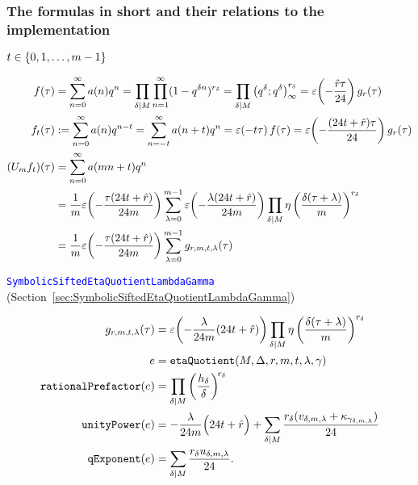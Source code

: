 \documentclass{article}
\begin{document}
\subsubsection{The formulas in short and their relations to the
  implementation}
\label{sec:formulas-in-short}
$t \in \left\{0,1,\ldots,m-1\right\}$

\begin{align*}
  f(\tau)
  &=
  \sum_{n=0}^\infty a(n) q^n
  =
  \prod_{\delta \mid M}\prod_{n=1}^\infty(1-q^{\delta n})^{r_\delta}
  =
  \prod_{\delta \mid M}\left( q^{\delta};q^{\delta} \right)_{\infty}^{r_\delta}
  =
  \varepsilon\!\left(-\frac{\hat{r} \tau}{24}\right) g_r(\tau)
  \\
  f_t(\tau)
  &:=
  \sum_{n=0}^\infty a(n) q^{n-t}
  =
  \sum_{n=-t}^\infty a(n+t) q^{n}
  =
  \varepsilon\!\left(-t\tau\right)f(\tau)
  =
  \varepsilon\!\left(-\frac{(24t+\hat{r}) \tau}{24}\right) g_r(\tau)
  \\
  (U_mf_t)(\tau)
  &=
    \sum_{n=0}^\infty a(mn+t) q^n
  \\
  &=
  \frac{1}{m}
  \varepsilon\!\left(-\frac{\tau (24t+\hat{r})}{24m}\right)
  \sum_{\lambda=0}^{m-1}
  \varepsilon\!\left(-\frac{\lambda (24t+\hat{r})}{24m}\right)
  \prod_{\delta \mid M}
    \eta\left(\frac{\delta(\tau+\lambda)}{m}\right)^{r_\delta}
  \\
  &=
  \frac{1}{m}
  \varepsilon\!\left(-\frac{\tau (24t+\hat{r})}{24m}\right)
    \sum_{\lambda=0}^{m-1} g_{r,m,t,\lambda}(\tau)
\end{align*}

\textcolor{blue}{\texttt{SymbolicSiftedEtaQuotientLambdaGamma}}
(Section~\ref{sec:SymbolicSiftedEtaQuotientLambdaGamma})

\begin{align*}
  g_{r,m,t,\lambda}(\tau)
  &=
  \varepsilon\!\left(-\frac{\lambda}{24m} (24t+\hat{r})\right)
    \prod_{\delta \mid M}
    \eta\left(\frac{\delta(\tau+\lambda)}{m}\right)^{r_\delta}
  \\
  e &= \mathtt{etaQuotient}(M, \Delta, r, m, t, \lambda , \gamma)
  \\
  \mathtt{rationalPrefactor}(e)
  &=
    \prod_{\delta \mid M} \left(\frac{h_\delta}{\delta}\right)^{\!r_\delta}
  \\
  \mathtt{unityPower}(e)
  &=
    -\frac{\lambda}{24m}\Bigl(24t+\hat{r}\Bigr) +
    \sum_{\delta \mid M} \frac{r_\delta(v_{\delta,m,\lambda} +
                         \kappa_{\gamma_{\delta,m,\lambda}})}{24}
  \\
  \mathtt{qExponent}(e)
  &=
    \sum_{\delta \mid M} \frac{r_\delta u_{\delta,m,\lambda}}{24}.
\end{align*}
\end{document}
